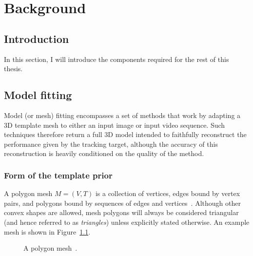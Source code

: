 
\chapter{Background}

\ifpdf
    \graphicspath{{Chapter2/Figs/Raster/}{Chapter2/Figs/PDF/}{Chapter2/Figs/}}
\else
    \graphicspath{{Chapter2/Figs/Vector/}{Chapter2/Figs/}}
\fi

\section{Introduction}

In this section, I will introduce the components required for the rest of this thesis.


\section{Model fitting}
    Model (or mesh) fitting encompasses a set of methods that work by adapting a 3D template mesh to either an input image or input video sequence. Such techniques therefore return a full 3D model intended to faithfully reconstruct the performance given by the tracking target, although the accuracy of this reconstruction is heavily conditioned on the quality of the method.
    

    \subsection{Form of the template prior}
    A polygon mesh $M = (V, T)$ is a collection of vertices, edges bound by vertex pairs, and polygons bound by sequences of edges and vertices~\cite{smith2006vertex}. Although other convex shapes are allowed, mesh polygons will always be considered triangular (and hence referred to as \emph{triangles}) unless explicitly stated otherwise. An example mesh is shown in Figure~\ref{fig:polygon_mesh}. 
    
    \begin{figure}[H] %
        \caption{A polygon mesh~\cite{polygon_mesh}.}
        \label{fig:polygon_mesh}
    \end{figure}

